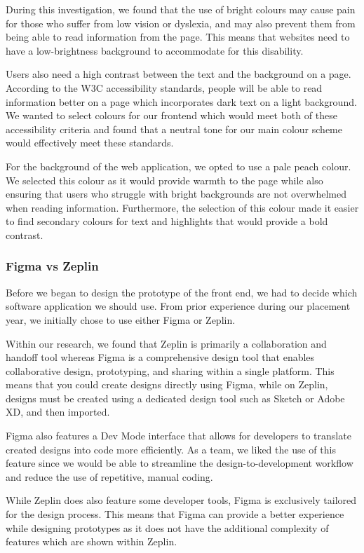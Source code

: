\documentclass{article}
\begin{document}
During this investigation, we found that the use of bright colours may cause pain for those who suffer from low vision or dyslexia, and may also prevent them from being able to read information from the page. This means that websites need to have a low-brightness background to accommodate for this disability.

Users also need a high contrast between the text and the background on a page. According to the W3C accessibility standards, people will be able to read information better on a page which incorporates dark text on a light background. We wanted to select colours for our frontend which would meet both of these accessibility criteria and found that a neutral tone for our main colour scheme would effectively meet these standards.

For the background of the web application, we opted to use a pale peach colour. We selected this colour as it would provide warmth to the page while also ensuring that users who struggle with bright backgrounds are not overwhelmed when reading information. Furthermore, the selection of this colour made it easier to find secondary colours for text and highlights that would provide a bold contrast.

\subsubsection{Figma vs Zeplin}
Before we began to design the prototype of the front end, we had to decide which software application we should use. From prior experience during our placement year, we initially chose to use either Figma or Zeplin.

Within our research, we found that Zeplin is primarily a collaboration and handoff tool whereas Figma is a comprehensive design tool that enables collaborative design, prototyping, and sharing within a single platform. This means that you could create designs directly using Figma, while on Zeplin, designs must be created using a dedicated design tool such as Sketch or Adobe XD, and then imported.

Figma also features a Dev Mode interface that allows for developers to translate created designs into code more efficiently. As a team, we liked the use of this feature since we would be able to streamline the design-to-development workflow and reduce the use of repetitive, manual coding.

While Zeplin does also feature some developer tools, Figma is exclusively tailored for the design process. This means that Figma can provide a better experience while designing prototypes as it does not have the additional complexity of features which are shown within Zeplin.
\end{document}
